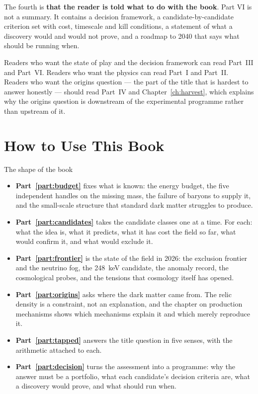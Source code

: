 The fourth is \textbf{that the reader is told what to do with the book}. Part
VI is not a summary. It contains a decision framework, a candidate-by-candidate
criterion set with cost, timescale and kill conditions, a statement of what a
discovery would and would not prove, and a roadmap to 2040 that says what
should be running when.

Readers who want the state of play and the decision framework can read
Part~III and Part~VI. Readers who want the physics can read Part~I and
Part~II. Readers who want the origins question --- the part of the title that
is hardest to answer honestly --- should read Part~IV and Chapter~\ref{ch:harvest},
which explains why the origins question is downstream of the experimental
programme rather than upstream of it.

\chapter*{How to Use This Book}

\thispagestyle{plain}

\begin{takeaway}{The shape of the book}
\begin{itemize}
\item \textbf{Part~\ref{part:budget}} fixes what is known: the energy budget, the
five independent handles on the missing mass, the failure of baryons to supply
it, and the small-scale structure that standard dark matter struggles to
produce.
\item \textbf{Part~\ref{part:candidates}} takes the candidate classes one at a
time. For each: what the idea is, what it predicts, what it has cost the field
so far, what would confirm it, and what would exclude it.
\item \textbf{Part~\ref{part:frontier}} is the state of the field in 2026: the
exclusion frontier and the neutrino fog, the 248~keV candidate, the anomaly
record, the cosmological probes, and the tensions that cosmology itself has
opened.
\item \textbf{Part~\ref{part:origins}} asks where the dark matter came from.
The relic density is a constraint, not an explanation, and the chapter on
production mechanisms shows which mechanisms explain it and which merely
reproduce it.
\item \textbf{Part~\ref{part:tapped}} answers the title question in five
senses, with the arithmetic attached to each.
\item \textbf{Part~\ref{part:decision}} turns the assessment into a programme:
why the answer must be a portfolio, what each candidate's decision criteria
are, what a discovery would prove, and what should run when.
\end{itemize}
\end{takeaway}

